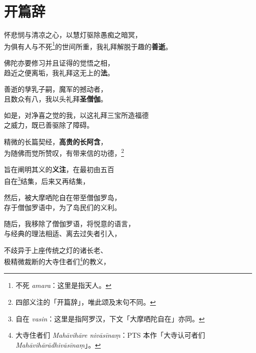 \chapter{开篇辞}

\begin{quoting}怀悲悯与清凉之心，以慧灯驱除愚痴之暗冥，\\为俱有人与不死\footnote{不死 \textit{amara}：这里是指天人。}的世间所重，我礼拜解脱于趣的\textbf{善逝}。\end{quoting}

\begin{quoting}佛陀亦要修习并且证得的觉悟之相，\\趋近之便离垢，我礼拜这无上的\textbf{法}。\end{quoting}

\begin{quoting}善逝的孳乳子嗣，魔军的撼动者，\\且数众有八，我以头礼拜\textbf{圣僧伽}。\end{quoting}

\begin{quoting}如是，对净喜之觉的我，以这礼拜三宝所造福德\\之威力，既已善驱除了障碍。\end{quoting}

\begin{quoting}精微的长篇契经，\textbf{高贵的长阿含}，\\为随佛而觉所赞叹，有带来信的功德，\footnote{四部义注的「开篇辞」，唯此颂及末句不同。}\end{quoting}

\begin{quoting}旨在阐明其义的\textbf{义注}，在最初由五百\\自在\footnote{自在 \textit{vasin}：这里是指阿罗汉，下文「大摩哂陀自在」亦同。}结集，后来又再结集，\end{quoting}

\begin{quoting}然后，被大摩哂陀自在带至僧伽罗岛，\\存于僧伽罗语中，为了岛民们的义利。\end{quoting}

\begin{quoting}随后，我移除了僧伽罗语，将悦意的语言，\\与经典的理法相适、离去过失者引入，\end{quoting}

\begin{quoting}不歧异于上座传统之灯的诸长老、\\极精微裁断的大寺住者们\footnote{大寺住者们 \textit{Mahāvihāre nivāsīnaṃ}：PTS 本作「大寺认可者们 \textit{Mahāvihārādhivāsīnaṃ}」。}的教义，\end{quoting}

